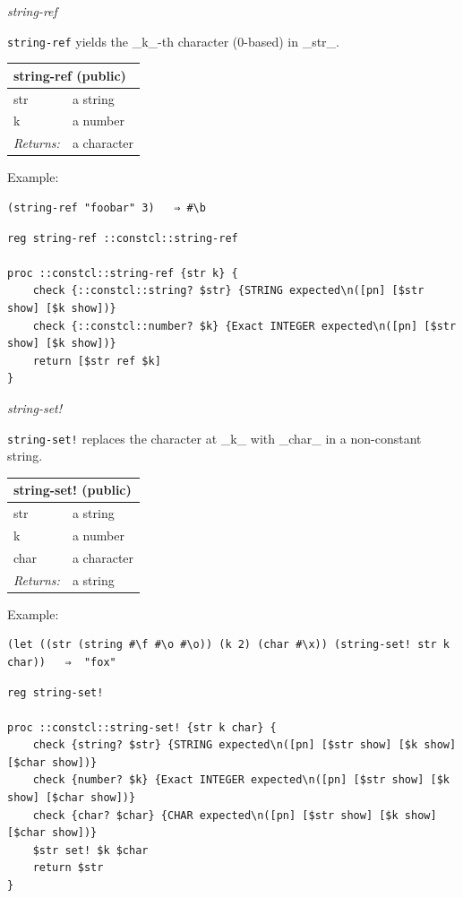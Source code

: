 \documentclass[twoside,9pt]{report}
\begin{document}
\emph{string-ref}


\texttt{string-ref} yields the \_k\_-th character (0-based) in \_str\_.

\begin{tabular}{ |l l| }
\hline
\multicolumn{2}{|l|}{string-ref (public)} \\
\hline
str & a string \\
k & a number \\
\textit{Returns:} & a character \\
\hline
\end{tabular}


Example:

\noindent\makebox[\linewidth]{\rule{\linewidth}{0.4pt}}
\begin{lstlisting}
(string-ref "foobar" 3)   ⇒ #\b
\end{lstlisting}
\noindent\makebox[\linewidth]{\rule{\linewidth}{0.4pt}}
\noindent\makebox[\linewidth]{\rule{\linewidth}{0.4pt}}
\begin{lstlisting}
reg string-ref ::constcl::string-ref
 
proc ::constcl::string-ref {str k} {
    check {::constcl::string? $str} {STRING expected\n([pn] [$str show] [$k show])}
    check {::constcl::number? $k} {Exact INTEGER expected\n([pn] [$str show] [$k show])}
    return [$str ref $k]
}
\end{lstlisting}
\noindent\makebox[\linewidth]{\rule{\linewidth}{0.4pt}}

\emph{string-set!}


\texttt{string-set!} replaces the character at \_k\_ with \_char\_ in a non-constant string.

\begin{tabular}{ |l l| }
\hline
\multicolumn{2}{|l|}{string-set! (public)} \\
\hline
str & a string \\
k & a number \\
char & a character \\
\textit{Returns:} & a string \\
\hline
\end{tabular}


Example:

\noindent\makebox[\linewidth]{\rule{\linewidth}{0.4pt}}
\begin{lstlisting}
(let ((str (string #\f #\o #\o)) (k 2) (char #\x)) (string-set! str k char))   ⇒  "fox"
\end{lstlisting}
\noindent\makebox[\linewidth]{\rule{\linewidth}{0.4pt}}
\noindent\makebox[\linewidth]{\rule{\linewidth}{0.4pt}}
\begin{lstlisting}
reg string-set!
 
proc ::constcl::string-set! {str k char} {
    check {string? $str} {STRING expected\n([pn] [$str show] [$k show] [$char show])}
    check {number? $k} {Exact INTEGER expected\n([pn] [$str show] [$k show] [$char show])}
    check {char? $char} {CHAR expected\n([pn] [$str show] [$k show] [$char show])}
    $str set! $k $char
    return $str
}
\end{lstlisting}
\noindent\makebox[\linewidth]{\rule{\linewidth}{0.4pt}}
\end{document}
